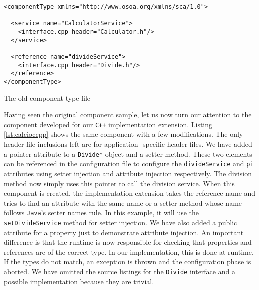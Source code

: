 \begin{listing}
\begin{verbatim}
<componentType xmlns="http://www.osoa.org/xmlns/sca/1.0">

  <service name="CalculatorService">
    <interface.cpp header="Calculator.h"/>
  </service>

  <reference name="divideService">
    <interface.cpp header="Divide.h"/>
  </reference>
</componentType>
\end{verbatim}
\caption{The old component type file}
\label{lst:calccppccomponenttype}
\end{listing}

Having seen the original component sample, let us now turn our attention to the component
developed for our \texttt{C++} implementation extension. Listing \ref{lst:calcioccpp} shows the same
component with a few modifications. The only header file inclusions left are for application-
specific header files. We have added a pointer attribute to a \texttt{Divide*} object and a
setter method. These two elements can be referenced in the configuration file to configure
the \texttt{divideService} and \texttt{pi} attributes using setter injection and attribute injection respectively.
The division method now simply uses this pointer to call the division service.
When this component is created, the implementation extension takes the reference name and
tries to find an attribute with the same name or a setter method whose name follows \texttt{Java}'s
setter names rule. In this example, it will use the \texttt{setDivideService} method for
setter injection. We have also added a public attribute for a property just to demonstrate
attribute injection. An important difference is that the runtime is now responsible for
checking that properties and references are of the correct type. In our implementation, this
is done at runtime. If the types do not match, an exception is thrown and the configuration
phase is aborted. We have omitted the source listings for the \texttt{Divide} interface and
a possible implementation because they are trivial.

